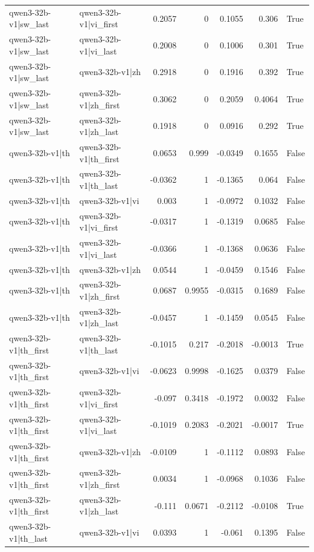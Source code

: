 \begin{table}
\begin{tabular}{l l r r r r l}
qwen3-32b-v1|sw_last & qwen3-32b-v1|vi_first & 0.2057 & 0 & 0.1055 & 0.306 & True \\
qwen3-32b-v1|sw_last & qwen3-32b-v1|vi_last & 0.2008 & 0 & 0.1006 & 0.301 & True \\
qwen3-32b-v1|sw_last & qwen3-32b-v1|zh & 0.2918 & 0 & 0.1916 & 0.392 & True \\
qwen3-32b-v1|sw_last & qwen3-32b-v1|zh_first & 0.3062 & 0 & 0.2059 & 0.4064 & True \\
qwen3-32b-v1|sw_last & qwen3-32b-v1|zh_last & 0.1918 & 0 & 0.0916 & 0.292 & True \\
qwen3-32b-v1|th & qwen3-32b-v1|th_first & 0.0653 & 0.999 & -0.0349 & 0.1655 & False \\
qwen3-32b-v1|th & qwen3-32b-v1|th_last & -0.0362 & 1 & -0.1365 & 0.064 & False \\
qwen3-32b-v1|th & qwen3-32b-v1|vi & 0.003 & 1 & -0.0972 & 0.1032 & False \\
qwen3-32b-v1|th & qwen3-32b-v1|vi_first & -0.0317 & 1 & -0.1319 & 0.0685 & False \\
qwen3-32b-v1|th & qwen3-32b-v1|vi_last & -0.0366 & 1 & -0.1368 & 0.0636 & False \\
qwen3-32b-v1|th & qwen3-32b-v1|zh & 0.0544 & 1 & -0.0459 & 0.1546 & False \\
qwen3-32b-v1|th & qwen3-32b-v1|zh_first & 0.0687 & 0.9955 & -0.0315 & 0.1689 & False \\
qwen3-32b-v1|th & qwen3-32b-v1|zh_last & -0.0457 & 1 & -0.1459 & 0.0545 & False \\
qwen3-32b-v1|th_first & qwen3-32b-v1|th_last & -0.1015 & 0.217 & -0.2018 & -0.0013 & True \\
qwen3-32b-v1|th_first & qwen3-32b-v1|vi & -0.0623 & 0.9998 & -0.1625 & 0.0379 & False \\
qwen3-32b-v1|th_first & qwen3-32b-v1|vi_first & -0.097 & 0.3418 & -0.1972 & 0.0032 & False \\
qwen3-32b-v1|th_first & qwen3-32b-v1|vi_last & -0.1019 & 0.2083 & -0.2021 & -0.0017 & True \\
qwen3-32b-v1|th_first & qwen3-32b-v1|zh & -0.0109 & 1 & -0.1112 & 0.0893 & False \\
qwen3-32b-v1|th_first & qwen3-32b-v1|zh_first & 0.0034 & 1 & -0.0968 & 0.1036 & False \\
qwen3-32b-v1|th_first & qwen3-32b-v1|zh_last & -0.111 & 0.0671 & -0.2112 & -0.0108 & True \\
qwen3-32b-v1|th_last & qwen3-32b-v1|vi & 0.0393 & 1 & -0.061 & 0.1395 & False \\

\end{tabular}
\end{table}
